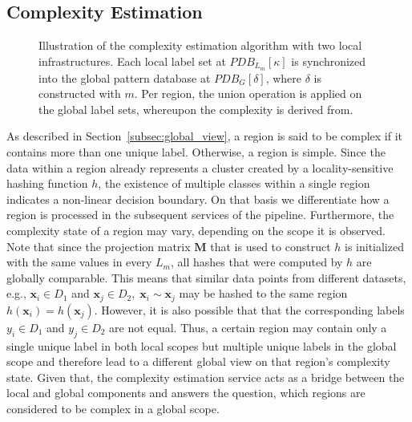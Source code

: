 \documentclass[../../main.tex]{subfiles}
\begin{document}
\subsection{Complexity Estimation} \label{sec:complexity_estimation}

\begin{figure}[b!]
   \centering
   
   \caption[Illustration of the complexity estimation]{Illustration of the complexity estimation algorithm with two local infrastructures. Each local label set at $PDB_{L_m}[\kappa]$ is synchronized into the global pattern database at $PDB_G[\delta]$, where $\delta$ is constructed with $m$. Per region, the union operation is applied on the global label sets, whereupon the complexity is derived from.}  \label{fig:complexity_estimation}
\end{figure}

As described in Section~\ref{subsec:global_view}, a region is said to be complex if it contains more than one unique label. Otherwise, a region is simple. Since the data within a region already represents a cluster created by a locality-sensitive hashing function $h$, the existence of multiple classes within a single region indicates a non-linear decision boundary. On that basis we differentiate how a region is processed in the subsequent services of the pipeline. Furthermore, the complexity state of a region may vary, depending on the scope it is observed. Note that since the projection matrix $\bm{M}$ that is used to construct $h$ is initialized with the same values in every $L_m$, all hashes that were computed by $h$ are globally comparable. This means that similar data points from different datasets, e.g., $\bm{x}_i \in D_1$ and $\bm{x}_j \in D_2, \; \bm{x}_i \sim \bm{x}_j$ may be hashed to the same region $h(\bm{x}_i) = h(\bm{x}_j)$. However, it is also possible that that the corresponding labels $y_i \in D_1$ and $y_j \in D_2$ are not equal. Thus, a certain region may contain only a single unique label in both local scopes but multiple unique labels in the global scope and therefore lead to a different global view on that region's complexity state. Given that, the complexity estimation service acts as a bridge between the local and global components and answers the question, which regions are considered to be complex in a global scope.
\end{document}
